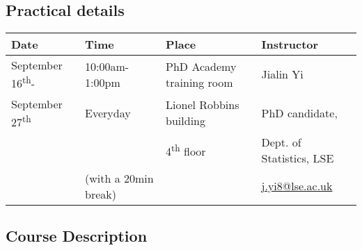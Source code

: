 \documentclass{amsart}
\theoremstyle{definition}
\theoremstyle{remark}
\numberwithin{equation}{section}
\begin{document}



\subsection*{Practical details}


\begin{center}
\begin{tabular}{| p{2.5cm} p{3.5cm} p{4.5cm} p{4.5cm} |} 
\hline
 \textbf{Date} & \textbf{Time} & \textbf{Place} & \textbf{Instructor} \\
\hline
 September 16\textsuperscript{th}- & 10:00am-1:00pm & PhD Academy training room & Jialin Yi \\
 September 27\textsuperscript{th} & Everyday & Lionel Robbins building & PhD candidate,  \\
     &   & 4\textsuperscript{th} floor &  Dept. of Statistics, LSE \\
    & (with a 20min break)  &  &  \href{
mailto:j.yi8@lse.ac.uk}{j.yi8@lse.ac.uk} \\
\hline
\end{tabular}
\end{center}

\subsection*{Course Description}
\end{document}
